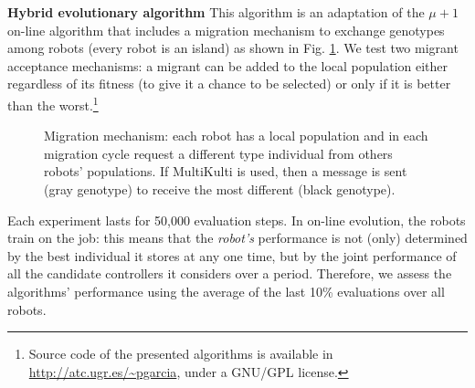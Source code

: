 \documentclass[runningheads]{llncs}
\begin{document}
{\bf Hybrid evolutionary algorithm}
This algorithm is an adaptation of the $\mu+1$ on-line algorithm that
includes a migration mechanism to exchange genotypes among robots
(every robot is an island) as shown in
Fig. \ref{fig:panmicticmultikulti}. We test two migrant acceptance
mechanisms: a migrant can be added to the local population either
regardless of its fitness (to give it a chance to be selected) or only
if it is better than the worst.\footnote{Source code of the presented
  algorithms is available in \url{http://atc.ugr.es/~pgarcia}, under a
  GNU/GPL license.} 

\begin{figure}[t!]
\begin{center}
\centerline{ 
%
}
\end{center}
\vspace{-24pt}
\caption{Migration mechanism: each robot has a local population and in each migration cycle request a different type individual from others robots' populations. If MultiKulti is used, then a message is sent (gray genotype) to receive the most different (black genotype).}
\vspace{-18pt}
\label{fig:panmicticmultikulti}
\end{figure}

Each experiment lasts for 50,000 evaluation steps. 
In on-line evolution, the robots train on the job: this means that the {\em robot's} performance is not (only) determined by the best individual it stores at any one time, but by the joint performance of all the candidate controllers it considers over a period. Therefore, we assess the algorithms' performance using the average of the last 10\% evaluations over all robots.

\end{document}
